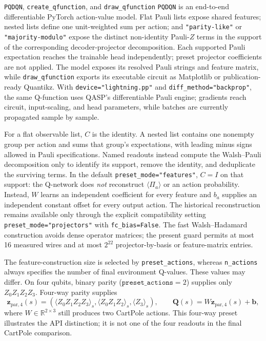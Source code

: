 \documentclass[10pt]{article}
\newcommand{\code}[1]{\texttt{#1}}
\newcommand{\R}{\mathbb{R}}
\begin{document}
\begin{qaspfeature}{\code{PQDQN}, \code{create\_qfunction}, and \code{draw\_qfunction}}
\code{PQDQN} is an end-to-end differentiable PyTorch action-value model.
Flat Pauli lists expose shared features; nested lists define one unit-weighted
sum per action; and \code{"parity-like"} or
\code{"majority-modulo"} expose the distinct non-identity Pauli-$Z$ terms in
the support of the corresponding decoder-projector decomposition.  Each
supported Pauli expectation reaches the trainable head independently; preset
projector coefficients are not applied.  The model exposes its resolved Pauli
strings and feature matrix, while
\code{draw\_qfunction} exports its executable circuit as Matplotlib or
publication-ready Quantikz.  With \code{device="lightning.pp"} and
\code{diff\_method="backprop"}, the same Q-function uses QASP's differentiable
Pauli engine; gradients reach circuit, input-scaling, and head parameters,
while batches are currently propagated sample by sample.
\end{qaspfeature}

For a flat observable list, $C$ is the identity.  A nested list contains one
nonempty group per action and sums that group's expectations, with leading
minus signs allowed in Pauli specifications.  Named readouts instead compute
the Walsh--Pauli decomposition only to identify its support, remove the
identity, and deduplicate the surviving terms.  In the default
\code{preset\_mode="features"}, $C=I$ on that support: the Q-network does
\emph{not} reconstruct $\langle\Pi_a\rangle$ or an action probability.
Instead, $W$ learns an independent coefficient for every feature and $b_a$
supplies an independent constant offset for every output action.  The
historical reconstruction remains available only through the explicit
compatibility setting \code{preset\_mode="projectors"} with
\code{fc\_bias=False}.  The fast Walsh--Hadamard construction avoids dense
operator matrices; the present guard permits at most 16 measured wires and at
most $2^{22}$ projector-by-basis or feature-matrix entries.

The feature-construction size is selected by \code{preset\_actions}, whereas
\code{n\_actions} always specifies the number of final environment Q-values.
These values may differ.  On four qubits, binary parity
($\code{preset\_actions}=2$) supplies only
$Z_0Z_1Z_2Z_3$.  Four-way parity supplies
\begin{equation}
  \bm z_{\mathrm{par},4}(s)=
  \left(
    \langle Z_0Z_1Z_2Z_3\rangle_s,
    \langle Z_0Z_1Z_2\rangle_s,
    \langle Z_3\rangle_s
  \right),
  \qquad
  \bm Q(s)=W\bm z_{\mathrm{par},4}(s)+\bm b,
  \label{eq:pqdqn-parity-a4}
\end{equation}
where $W\in\R^{2\times3}$ still produces two CartPole actions.  This
four-way preset illustrates the API distinction; it is not one of the four
readouts in the final CartPole comparison.
\end{document}
